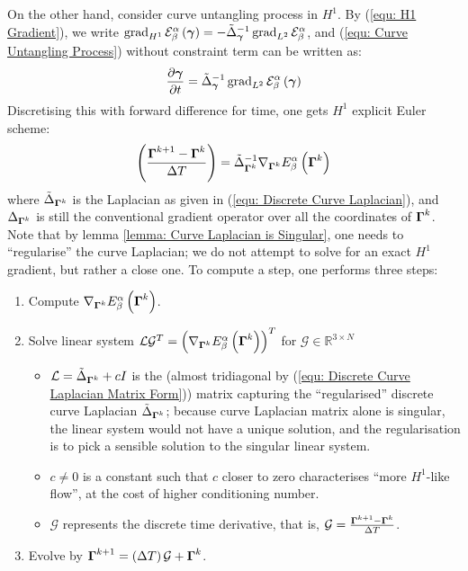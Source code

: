 \documentclass[../dissertation.tex]{subfiles}
\begin{document}
On the other hand, consider curve untangling process in $H^1$.
By (\ref{equ: H1 Gradient}), we write $\operatorname{grad}_{H^1} \mathcal{E}_{\beta}^{\alpha} \left( \boldsymbol{\gamma} \right) = - \tilde{\Delta}_{\boldsymbol{\gamma}}^{-1} \operatorname{grad}_{L^2} \mathcal{E}_{\beta}^{\alpha}$,
and
(\ref{equ: Curve Untangling Process}) without constraint term can be written as:
\begin{equation}
    \frac{\partial \boldsymbol{\gamma}}{\partial t} = \tilde{\Delta}_{\boldsymbol{\gamma}}^{-1} \operatorname{grad}_{L^2} \mathcal{E}_{\beta}^{\alpha} \left( \boldsymbol{\gamma} \right)
\end{equation}
Discretising this with forward difference for time, one gets $H^1$ explicit Euler scheme:
\begin{equation}
    \left( \frac{\boldsymbol{\Gamma}^{k+1} - \boldsymbol{\Gamma}^k}{\Delta T} \right) = \tilde{\Delta}_{\boldsymbol{\Gamma}^k}^{-1} \nabla_{\boldsymbol{\Gamma}^k} E_{\beta}^{\alpha} \left( \boldsymbol{\Gamma}^k \right)
\end{equation}
where $\tilde{\Delta}_{\boldsymbol{\Gamma}^k}$ is the Laplacian as given in (\ref{equ: Discrete Curve Laplacian}),
and $\Delta_{\boldsymbol{\Gamma}^k}$ is still the conventional gradient operator over all the coordinates of $\boldsymbol{\Gamma}^k$.
Note that by lemma \ref{lemma: Curve Laplacian is Singular}, one needs to ``regularise'' the curve Laplacian;
we do not attempt to solve for an exact $H^1$ gradient, but rather a close one.
To compute a step, one performs three steps:
\begin{enumerate}
    \item Compute $\nabla_{\boldsymbol{\Gamma}^k} E_{\beta}^{\alpha} \left( \boldsymbol{\Gamma}^k \right)$.
    \item Solve linear system $\mathcal{L} \mathcal{G}^{T} = \left( \nabla_{\boldsymbol{\Gamma}^k} E_{\beta}^{\alpha} \left( \boldsymbol{\Gamma}^k \right) \right)^T$ for $\mathcal{G} \in \mathbb{R}^{3 \times N}$
        \begin{itemize}
            \item $\mathcal{L} = \tilde{\Delta}_{\boldsymbol{\Gamma}^k} + cI$ is the (almost tridiagonal by (\ref{equ: Discrete Curve Laplacian Matrix Form})) matrix capturing the ``regularised'' discrete curve Laplacian $\tilde{\Delta}_{\boldsymbol{\Gamma}^k}$;
                because curve Laplacian matrix alone is singular, the linear system would not have a unique solution,
                and the regularisation is to pick a sensible solution to the singular linear system.
            \item $c \neq 0$ is a constant such that $c$ closer to zero characterises ``more $H^1$-like flow'', at the cost of higher conditioning number.
            \item $\mathcal{G}$ represents the discrete time derivative, that is, $\mathcal{G} = \frac{\boldsymbol{\Gamma}^{k+1} - \boldsymbol{\Gamma}^k}{\Delta T}$.
        \end{itemize}
    \item Evolve by $\boldsymbol{\Gamma}^{k+1} = \left( \Delta T \right) \mathcal{G} + \boldsymbol{\Gamma}^k$.
\end{enumerate}
\end{document}
